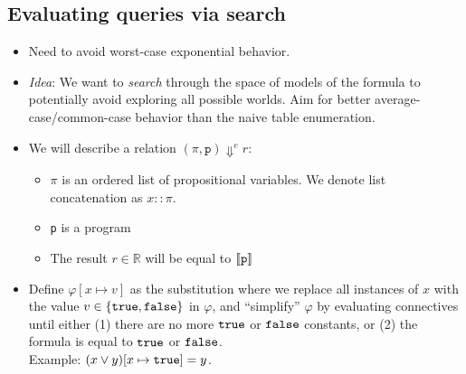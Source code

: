 \documentclass{tufte-handout}
\begin{document}
\subsection{Evaluating queries via search}
\begin{itemize}
  \item Need to avoid worst-case exponential behavior.
  \item \emph{Idea}: We want to \emph{search} through the space of models of
  the formula to potentially avoid exploring all possible worlds. Aim for better 
  average-case/common-case behavior than the naive table enumeration.
    

    \item We will describe a relation $(\pi, \texttt{p}) \Downarrow^e r$:
    \begin{itemize}[noitemsep]
        \item $\pi$ is an ordered list of propositional variables. We denote 
        list concatenation as $x::\pi$. 
        \item \texttt{p} is a \prop{} program
        \item The result $r\in\mathbb{R}$ will be equal to $\left \llbracket {\texttt{p}} \right \rrbracket$
    \end{itemize}

    \item Define $\varphi[x \mapsto v]$ as the substitution where we replace all
    instances of $x$ with the value $v \in \{\texttt{true}, \texttt{false}\}$ in $\varphi$, and
    ``simplify'' $\varphi$ by evaluating connectives until either (1) there are no more 
    $\texttt{true}$ or $\texttt{false}$ constants, or (2) the formula is equal to $\texttt{true}$ or $\texttt{false}$. 
    \\
    Example: $(x \lor y)[x \mapsto \texttt{true}] = y$.


\end{itemize}
\end{document}
